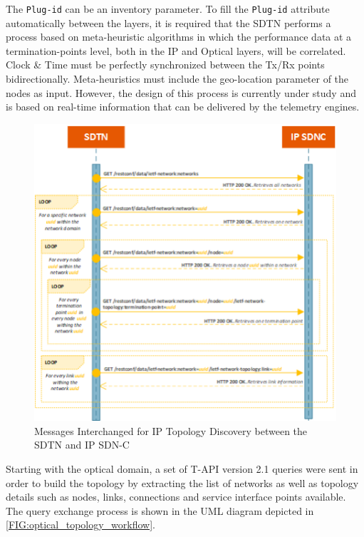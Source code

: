 \documentclass[a4paper,fleqn]{cas-dc}
\begin{document}
The \texttt{Plug-id} can be an inventory parameter. To fill the \texttt{Plug-id} attribute automatically between the layers, it is required that the SDTN performs a process based on meta-heuristic algorithms in which the performance data at a termination-points level, both in the IP and Optical layers, will be correlated. Clock \& Time must be perfectly synchronized between the Tx/Rx points bidirectionally. Meta-heuristics must include the geo-location parameter of the nodes as input. However, the design of this process is currently under study and is based on real-time information that can be delivered by the telemetry engines.

\begin{figure}
	\centering
		\includegraphics[width=\linewidth]{figs/ip_topology_workflow.png}
	\caption{Messages Interchanged for IP Topology Discovery between the SDTN and IP SDN-C}
	\label{FIG:ip_topology_workflow}
\end{figure}

Starting with the optical domain, a set of T-API version 2.1 queries were sent in order to build the topology by extracting the list of networks as well as topology details such as nodes, links, connections and service interface points available. The query exchange process is shown in the UML diagram depicted in \cref{FIG:optical_topology_workflow}.  
\end{document}
